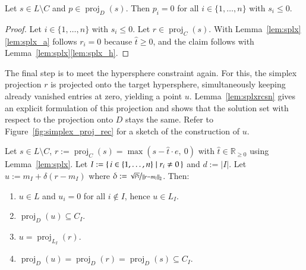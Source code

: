 \documentclass[twoside,11pt]{article}
\DeclareMathOperator{\proj}{proj}
\newcommand{\R}{\mathbb{R}}
\newcommand{\0}{\mathcal{O}}
\newcommand{\norm}[1]{\left\Vert#1\right\Vert}
\newcommand{\abs}[1]{\left\vert #1 \right\vert}
\newcommand{\discint}[2]{\{#1,\dotsc,#2\}}
\newcommand{\inint}[2]{\in\discint{#1}{#2}}
\begin{document}
\begin{corollary}
\label{cor:splx}
Let $s\in L\setminus C$ and $p\in\proj_D(s)$.
Then $p_i = 0$ for all $i\inint{1}{n}$ with $s_i \leq 0$.
\end{corollary}
\begin{proof}
Let $i\inint{1}{n}$ with $s_i \leq 0$.
Let $r\in\proj_C(s)$.
With Lemma~\ref{lem:splx}\ref{lem:splx_a} follows $r_i = 0$ because $\hat{t}\geq 0$, and the claim follows with Lemma~\ref{lem:splx}\ref{lem:splx_h}.
\end{proof}
The final step is to meet the hypersphere constraint again.
For this, the simplex projection $r$ is projected onto the target hypersphere, simultaneously keeping already vanished entries at zero, yielding a point $u$.
Lemma~\ref{lem:splxrcsn} gives an explicit formulation of this projection and shows that the solution set with respect to the projection onto $D$ stays the same.
Refer to Figure~\ref{fig:simplex_proj_rec} for a sketch of the construction of $u$.
\begin{lemma}
\label{lem:splxrcsn}
Let $s\in L\setminus C$, $r := \proj_C(s) = \max\left(s - \hat{t}\cdot e,\ 0\right)$ with $\hat{t}\in\R_{\geq 0}$ using Lemma~\ref{lem:splx}.
Let $I := \set{i\inint{1}{n} | r_i\neq 0}$ and $d := \abs{I}$.
Let $u := m_I + \delta\left(r - m_I\right)$ where $\delta := \nicefrac{\sqrt{\rho_I}}{\norm{r - m_I}_2}$.
Then:
\begin{enumerate}
\item \label{lem:splxrcsn_a}
$u\in L$ and $u_i = 0$ for all $i\not\in I$, hence $u\in L_I$.

\item \label{lem:splxrcsn_b}
$\proj_D(u)\subseteq C_I$.

\item \label{lem:splxrcsn_c}
$u = \proj_{L_I}(r)$.

\item \label{lem:splxrcsn_d}
$\proj_D(u) = \proj_D(r) = \proj_D(s) \subseteq C_I$.
\end{enumerate}
\end{lemma}
\end{document}
